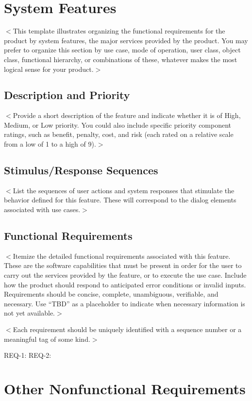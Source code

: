\documentclass{scrreprt}
\begin{document}
\begin{CJK}{UTF8}{bkai}
\chapter{System Features}
$<$This template illustrates organizing the functional requirements for the 
product by system features, the major services provided by the product. You may 
prefer to organize this section by use case, mode of operation, user class, 
object class, functional hierarchy, or combinations of these, whatever makes the 
most logical sense for your product.$>$

\section{Description and Priority}
$<$Provide a short description of the feature and indicate whether it is of 
High, Medium, or Low priority. You could also include specific priority 
component ratings, such as benefit, penalty, cost, and risk (each rated on a 
relative scale from a low of 1 to a high of 9).$>$

\section{Stimulus/Response Sequences}
$<$List the sequences of user actions and system responses that stimulate the 
behavior defined for this feature. These will correspond to the dialog elements 
associated with use cases.$>$

\section{Functional Requirements}
$<$Itemize the detailed functional requirements associated with this feature.  
These are the software capabilities that must be present in order for the user 
to carry out the services provided by the feature, or to execute the use case.  
Include how the product should respond to anticipated error conditions or 
invalid inputs. Requirements should be concise, complete, unambiguous, 
verifiable, and necessary. Use “TBD” as a placeholder to indicate when necessary 
information is not yet available.$>$

$<$Each requirement should be uniquely identified with a sequence number or a 
meaningful tag of some kind.$>$

REQ-1:	REQ-2:


\chapter{Other Nonfunctional Requirements}


\end{CJK}
\end{document}
